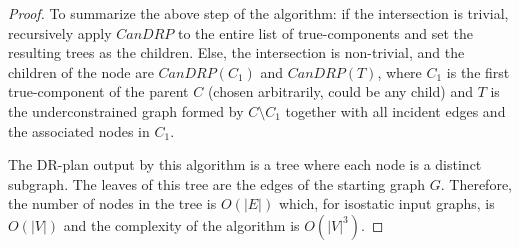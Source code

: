 \begin{proof}
To summarize the above step of the algorithm:
if the intersection is trivial, recursively apply $CanDRP$ to the entire list of true-components and set the resulting trees as the children. Else, the intersection is non-trivial, and the children of the node are $CanDRP(C_1)$ and $CanDRP(T)$, where $C_1$ is the first true-component of the parent $C$ (chosen arbitrarily, could be any child) and $T$ is the underconstrained graph formed by $C\setminus C_1$ together with all incident edges  and the associated nodes in $C_1$.


The DR-plan  output by this algorithm is a tree where each node is a distinct subgraph. The leaves of this tree are the edges of the starting graph $G$. Therefore, the number of nodes in the tree is $O(|E|)$ which, for isostatic input graphs, is $O(|V|)$ and the complexity of the algorithm is $O(|V|^3)$.
%
\end{proof}




